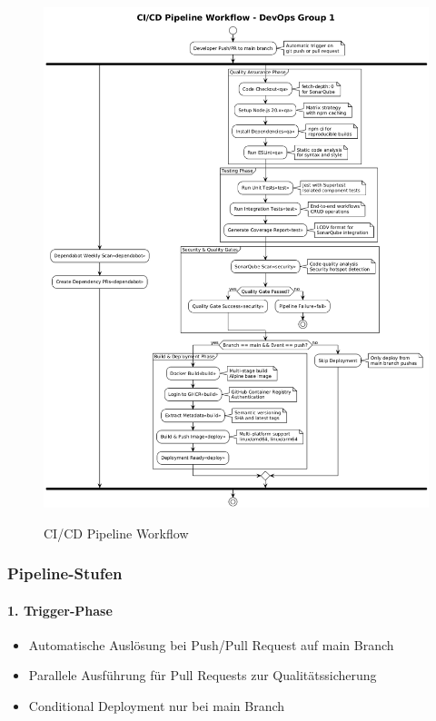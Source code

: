 \begin{figure}[h!]
    \centering
    \caption{CI/CD Pipeline Workflow}
    \includegraphics[width=1\textwidth]{fig/cicd-pipeline.png}
    \label{fig:cicd-pipeline}
\end{figure}

\subsubsection{Pipeline-Stufen}

\paragraph{1. Trigger-Phase}
\begin{itemize}
    \item Automatische Auslösung bei Push/Pull Request auf main Branch
    \item Parallele Ausführung für Pull Requests zur Qualitätssicherung
    \item Conditional Deployment nur bei main Branch
\end{itemize}

